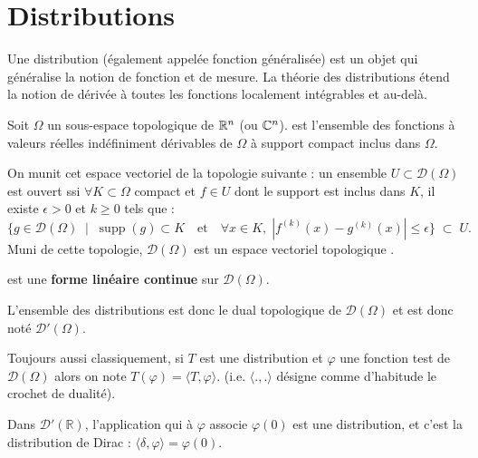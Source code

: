 \medskip
\section{Distributions}
Une distribution (également appelée fonction généralisée) est un objet qui généralise
la notion de fonction et de mesure.
La théorie des distributions étend la notion de dérivée à toutes les fonctions localement
intégrables et au-delà.

\medskip
\begin{definition}
Soit $\Omega$ un sous-espace topologique de $\mathbb R^n$ (ou $\mathbb C^n$).
 est l'ensemble des fonctions
à valeurs réelles indéfiniment dérivables de $\Omega$ à support compact inclus dans $\Omega$.

On munit cet espace vectoriel de la topologie suivante : un ensemble $U \subset \mathcal{D}(\Omega)$ est
ouvert ssi $\forall K \subset \Omega$ compact et $f \in U$ dont le support est inclus dans $K$,
il existe $\epsilon > 0$ et $k \ge 0$ tels que :
\begin{equation}
    \{ g \in \mathcal{D}(\Omega)\;\mid\; \operatorname{supp}(g) \subset K\quad\text{et}\quad\forall x \in K,\; |f^{(k)}(x)-g^{(k)}(x)|\le \epsilon \}\;\subset\;U.
\end{equation}
Muni de cette topologie, $\mathcal{D}(\Omega)$ est un espace vectoriel topologique .
\end{definition}

\medskip
\begin{definition}[Distribution]
 est une \textbf{forme linéaire continue}
sur $\mathcal{D}(\Omega)$.
\end{definition}

L'ensemble des distributions est donc le dual topologique de $\mathcal{D}(\Omega)$ et est donc noté $\mathcal{D}'(\Omega)$.

\medskip
Toujours aussi classiquement, si $T$ est une distribution et $\varphi$ une fonction test de
$\mathcal{D}(\Omega)$ alors on note $T(\varphi)=\langle T,\varphi \rangle$. (i.e.
$\langle ., . \rangle$ désigne comme d'habitude le crochet de dualité).

\medskip
Dans $\mathcal{D}'(\mathbb{R})$, l'application qui à $\varphi$ associe $\varphi(0)$ est une distribution, et
c'est la distribution de Dirac : $\langle\delta,\varphi\rangle=\varphi(0)$.

